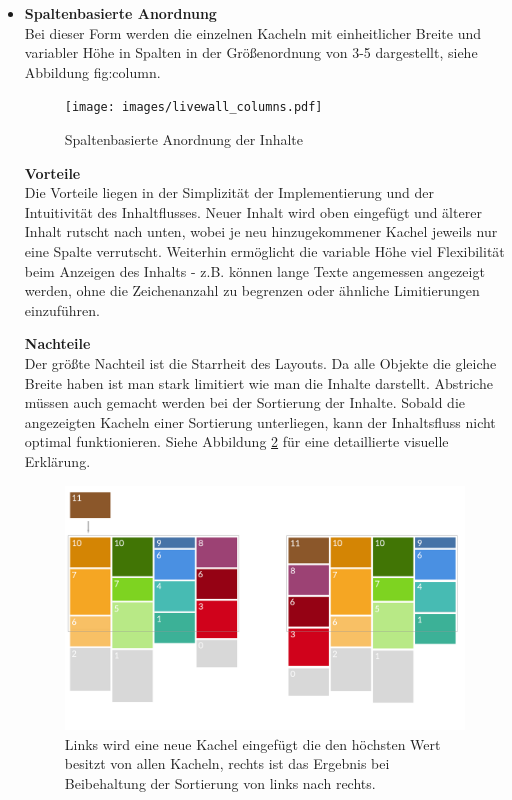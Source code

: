 \documentclass[12pt,twoside]{book}
\begin{document}
\begin{itemize}
  \item \textbf{Spaltenbasierte Anordnung} \\
  Bei dieser Form werden die einzelnen Kacheln mit einheitlicher Breite und variabler Höhe in Spalten in der Größenordnung von 3-5 dargestellt, siehe Abbildung {fig:column}.

  \begin{figure}[htbp]
    \centering
    \texttt{[image: images/livewall\_columns.pdf]}
    \caption{Spaltenbasierte Anordnung der Inhalte}
    \label{fig:column}
  \end{figure}

  \textbf{Vorteile} \\
  Die Vorteile liegen in der Simplizität der Implementierung und der Intuitivität des Inhaltflusses. Neuer Inhalt wird oben eingefügt und älterer Inhalt rutscht nach unten, wobei je neu hinzugekommener Kachel jeweils nur eine Spalte verrutscht.
  Weiterhin ermöglicht die variable Höhe viel Flexibilität beim Anzeigen des Inhalts - z.B. können lange Texte angemessen angezeigt werden, ohne die Zeichenanzahl zu begrenzen oder ähnliche Limitierungen einzuführen.

  \textbf{Nachteile}\\
  Der größte Nachteil ist die Starrheit des Layouts. Da alle Objekte die gleiche Breite haben ist man stark limitiert wie man die Inhalte darstellt. Abstriche müssen auch gemacht werden bei der Sortierung der Inhalte. Sobald die angezeigten Kacheln einer Sortierung unterliegen, kann der Inhaltsfluss nicht optimal funktionieren. Siehe Abbildung \ref{fig:livewall_sort} für eine detaillierte visuelle Erklärung.

  \begin{figure}[htbp]
    \centering
    \includegraphics[width=1.0\textwidth]{images/livewall_sort.png}
    \caption{Links wird eine neue Kachel eingefügt die den höchsten Wert besitzt von allen Kacheln, rechts ist das Ergebnis bei Beibehaltung der Sortierung von links nach rechts.}
    \label{fig:livewall_sort}
  \end{figure}


\end{itemize}
\end{document}
